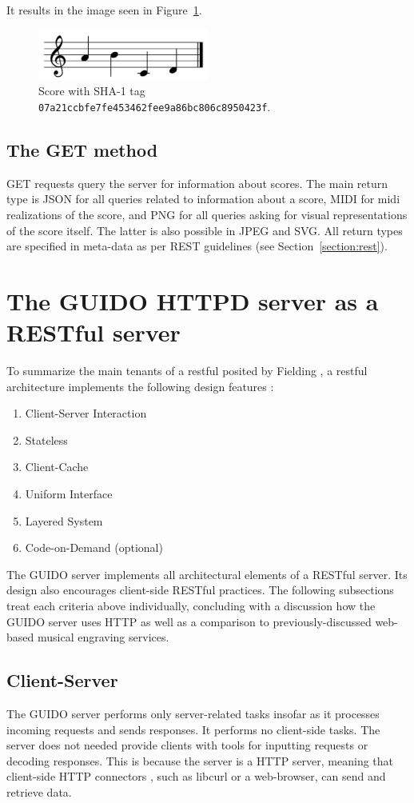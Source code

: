 \documentclass{article}
\begin{document}
It results in the image seen in Figure~\ref{fig:figure1}.
\begin{figure}[h]
  \centering
    \includegraphics[width=0.5\textwidth]{figure1}
  \cprotect\caption{\label{fig:figure1}Score with SHA-1 tag \verb=07a21ccbfe7fe453462fee9a86bc806c8950423f=.}
\end{figure}


\subsection{The GET method}\label{subsection:get}
GET requests query the server for information about scores. The main return type is JSON for all queries related to information about a score, MIDI for midi realizations of the score, and PNG for all queries asking for visual representations of the score itself.  The latter is also possible in JPEG and SVG.  All return types are specified in meta-data as per REST guidelines (see Section~\ref{section:rest}).\par
\section{The GUIDO HTTPD server as a RESTful server}\label{section:guido-restful}
To summarize the main tenants of a restful posited by Fielding \cite{Fielding00}, a restful architecture implements the following design features :
\begin{enumerate}[noitemsep]
\item Client-Server Interaction
\item Stateless
\item Client-Cache
\item Uniform Interface
\item Layered System
\item Code-on-Demand (optional)
\end{enumerate}
The GUIDO server implements all architectural elements of a RESTful server.  Its design also encourages client-side RESTful practices.  The following subsections treat each criteria above individually, concluding with a  discussion how the GUIDO server uses HTTP as well as a comparison to previously-discussed web-based musical engraving services.
\subsection{Client-Server}
The GUIDO server performs only server-related tasks insofar as it processes incoming requests and sends responses.  It performs no client-side tasks.  The server does not needed provide clients with tools for inputting requests or decoding responses.  This is because the server is a HTTP server, meaning that client-side HTTP connectors \cite{Fielding00}, such as libcurl or a web-browser, can send and retrieve data.
\end{document}
